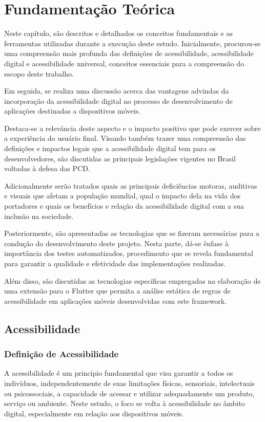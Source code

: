 \chapter{Fundamentação Teórica}

Neste capítulo, são descritos e detalhados os conceitos fundamentais e as ferramentas utilizadas durante a execução deste estudo. Inicialmente, procurou-se uma compreensão mais profunda das definições de acessibilidade, acessibilidade digital e acessibilidade universal, conceitos essenciais para a compreensão do escopo deste trabalho.

Em seguida, se realiza uma discussão acerca das vantagens advindas da incorporação da acessibilidade digital no processo de desenvolvimento de aplicações destinadas a dispositivos móveis.

Destaca-se a relevância deste aspecto e o impacto positivo que pode exercer sobre a experiência do usuário final. Visando também trazer uma compreensão das definições e impactos legais que a acessibilidade digital tem para os desenvolvedores, são discutidas as principais legislações vigentes no Brasil voltadas à defesa das PCD. 

Adicionalmente serão tratados quais as principais deficiências motoras, auditivas e visuais que afetam a população mundial, qual o impacto dela na vida dos portadores e quais os benefícios e relação da acessibilidade digital com a sua inclusão na sociedade.

Posteriormente, são apresentadas as tecnologias que se fizeram necessárias para a condução do desenvolvimento deste projeto. Nesta parte, dá-se ênfase à importância dos testes automatizados, procedimento que se revela fundamental para garantir a qualidade e efetividade das implementações realizadas.

Além disso, são discutidas as tecnologias específicas empregadas na elaboração de uma extensão para o Flutter que permita a análise estática de regras de acessibilidade em aplicações móveis desenvolvidas com este framework.

\section{Acessibilidade}

\subsection{Definição de Acessibilidade}

A acessibilidade é um princípio fundamental que visa garantir a todos os indivíduos, independentemente de suas limitações físicas, sensoriais, intelectuais ou psicossociais, a capacidade de acessar e utilizar adequadamente um produto, serviço ou ambiente. Neste estudo, o foco se volta à acessibilidade no âmbito digital, especialmente em relação aos dispositivos móveis.

